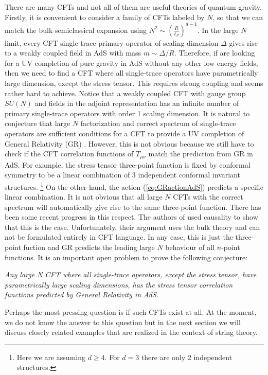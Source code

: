 \documentclass{ws-rv9x6}
\begin{document}
There are many CFTs and not all of them are useful theories of quantum
gravity. Firstly, it is convenient to consider a family of CFTs labeled
by $N$, so that we can match the bulk semiclassical expansion using
$N^{2}\sim\left(\frac{R}{\ell_{P}}\right)^{d-1}$. In the large $N$
limit, every CFT single-trace primary operator of scaling dimension
$\Delta$ gives rise to a weakly coupled field in AdS with mass $m\sim\Delta/R$.
Therefore, if are looking for a UV completion of pure gravity in AdS
without any other low energy fields, then we need to find a CFT where
all single-trace operators have parametrically large dimension, except
the stress tensor. This requires strong coupling and seems rather
hard to achieve. Notice that a weakly coupled CFT with gauge group
$SU(N)$ and fields in the adjoint representation has an infinite
number of primary single-trace operators with order 1 scaling dimension.
It is natural to conjecture that large $N$ factorization and correct
spectrum of single-trace operators are sufficient conditions for a
CFT to provide a UV completion of General Relativity (GR) \cite{arXiv:0907.0151}.
However, this is not obvious because we still have to check if the
CFT correlation functions of $T_{\mu\nu}$ match the prediction from
GR in AdS. For example, the stress tensor three-point function is
fixed by conformal symmetry to be a linear combination of 3 independent
conformal invariant structures. 
\footnote{Here we are assuming $d\ge4$. For $d=3$ there are only 2 independent
structures.} On the other hand, the action (\ref{eq:GRactionAdS}) predicts a
specific linear combination. It is not obvious that all large $N$
CFTs with the correct spectrum will automatically give rise to the
same three-point function. There has been some recent progress in
this respect. The authors of \cite{arXiv:1407.5597} used causality
to show that this is the case. Unfortunately, their argument uses
the bulk theory and can not be formulated entirely in CFT language.
In any case, this is just the three-point fuction and GR predicts
the leading large $N$ behaviour of all $n$-point functions. It is
an important open problem to prove the following conjecture:

\emph{Any large N CFT where all single-trace operators, except the stress tensor, have parametrically large scaling dimensions, has the stress tensor correlation functions predicted by General Relativity in AdS.}

Perhaps the most pressing question is if such CFTs exist at all. At
the moment, we do not know the answer to this question but in the
next section we will discuss closely related examples that are realized
in the context of string theory.
\end{document}

